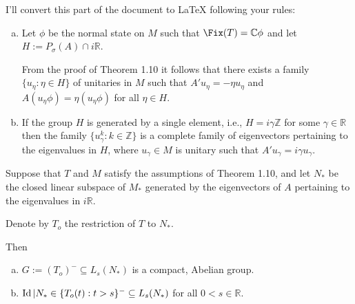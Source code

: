 
I'll convert this part of the document to LaTeX following your rules:

\begin{remarks}\label{rem:d3-1-11}
\begin{enumerate}[(a)]
\item Let $\phi$ be the normal state on $M$ such that $\Fix(T) = \mathbb{C}\phi$ and let $H := P_{\sigma}(A) \cap i\mathbb{R}$.

From the proof of Theorem 1.10 it follows that there exists a family $\{u_{\eta} : \eta \in H\}$ of unitaries in $M$ such that $A'u_{\eta} = -\eta u_{\eta}$ and $A(u_{\eta}\phi) = \eta(u_{\eta}\phi)$ for all $\eta \in H$.

\item If the group $H$ is generated by a single element, i.e., $H = i\gamma\mathbb{Z}$ for some $\gamma \in \mathbb{R}$ then the family $\{u_{\gamma}^{k} : k \in \mathbb{Z}\}$ is a complete family of eigenvectors pertaining to the eigenvalues in $H$, where $u_{\gamma} \in M$ is unitary such that $A'u_{\gamma} = i\gamma u_{\gamma}$.
\end{enumerate}
\end{remarks}

\begin{proposition}\label{prop:d3-1-12}
Suppose that $T$ and $M$ satisfy the assumptions of Theorem 1.10, and let $N_{*}$ be the closed linear subspace of $M_{*}$ generated by the eigenvectors of $A$ pertaining to the eigenvalues in $i\mathbb{R}$.

Denote by $T_{o}$ the restriction of $T$ to $N_{*}$.

Then
\begin{enumerate}[(a)]
\item $G := (T_{o})^{-} \subseteq L_{s}(N_{*})$ is a compact, Abelian group.

\item $\operatorname{Id}|N_{*}\in\{T_{o}(t) : t>s\}^{-} \subseteq L_{s}(N_{*})$ for all $0<s \in \mathbb{R}$.
\end{enumerate}
\end{proposition}

